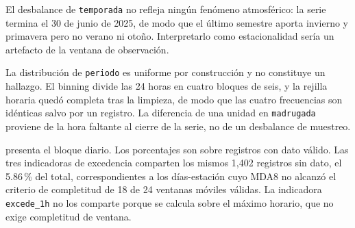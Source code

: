 El desbalance de \texttt{temporada} no refleja ningún fenómeno atmosférico: la
serie termina el 30 de junio de 2025, de modo que el último semestre aporta
invierno y primavera pero no verano ni otoño. Interpretarlo como
estacionalidad sería un artefacto de la ventana de observación.

La distribución de \texttt{periodo} es uniforme por construcción y no
constituye un hallazgo. El binning divide las 24 horas en cuatro bloques de
seis, y la rejilla horaria quedó completa tras la limpieza, de modo que las
cuatro frecuencias son idénticas salvo por un registro. La diferencia de una
unidad en \texttt{madrugada} proviene de la hora faltante al cierre de la
serie, no de un desbalance de muestreo.

 presenta el bloque diario. Los porcentajes son sobre registros con dato válido. Las tres indicadoras de
excedencia comparten los mismos 1,402 registros sin dato, el 5.86\,\% del total, correspondientes a
los días-estación cuyo MDA8 no alcanzó el criterio de completitud de 18 de 24
ventanas móviles válidas. La indicadora \texttt{excede\_1h} no los comparte
porque se calcula sobre el máximo horario, que no exige completitud de
ventana.

